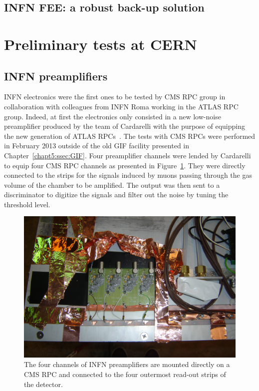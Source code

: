 	\subsection{INFN \acl{FEE}: a robust back-up solution}
	\label{chapt6:ssec:INFN}

\section{Preliminary tests at CERN}
\label{chapt6:sec:Preliminary}

	\subsection{INFN preamplifiers}
	\label{chapt6:ssec:INFN-Prelim}
	
	INFN electronics were the first ones to be tested by CMS RPC group in collaboration with colleagues from INFN Roma working in the ATLAS RPC group. Indeed, at first the electronics only consisted in a new low-noise preamplifier produced by the team of Cardarelli with the purpose of equipping the new generation of ATLAS RPCs~\cite{CARDARELLI2013}. The tests with CMS RPCs were performed in February 2013 outside of the old GIF facility presented in Chapter~\ref{chapt5:ssec:GIF}. Four preamplifier channels were lended by Cardarelli to equip four CMS RPC channels as presented in Figure~\ref{fig:INFN-preamp}. They were directly connected to the strips for the signals induced by muons passing through the gas volume of the chamber to be amplified. The output was then sent to a discriminator to digitize the signals and filter out the noise by tuning the threshold level.
	
	\begin{figure}[H]
		\centering
		\includegraphics[width=0.8\plotwidth]{fig/chapt6/INFN-Preamp-2013.JPG}
		\caption{\label{fig:INFN-preamp} The four channels of INFN preamplifiers are mounted directly on a CMS RPC and connected to the four outermost read-out strips of the detector.}
	\end{figure}
	
